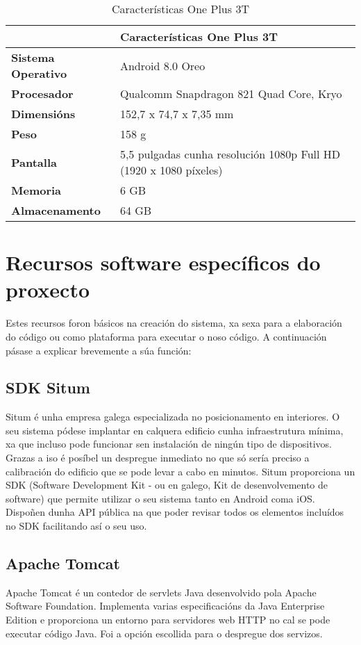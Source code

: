 \begin{table} [tbp]
	\begin{tabular}{|l|p{10cm}|}
		\hline 
		& \textbf{Características One Plus 3T} \\ 
		\hline 
		\textbf{Sistema Operativo} & Android 8.0 Oreo \\ 
		\hline 
		\textbf{Procesador} & Qualcomm Snapdragon 821 Quad Core, Kryo \\ 
		\hline 
		\textbf{Dimensións} & 152,7 x 74,7 x 7,35 mm \\ 
		\hline 
		\textbf{Peso} & 158 g \\ 
		\hline 
		\textbf{Pantalla} & 5,5 pulgadas cunha resolución 1080p Full HD (1920 x 1080 píxeles) \\ 
		\hline 
		\textbf{Memoria} & 6 GB \\ 
		\hline
		\textbf{Almacenamento} & 64 GB \\ 
		\hline 
	\end{tabular}
	\caption{Características One Plus 3T}
	\label{tab:tabCaracteristicasOnePlus}
\end{table}


\section{Recursos software específicos do proxecto}
Estes recursos foron básicos na creación do sistema, xa sexa para a elaboración do código ou como plataforma para executar o noso código. A continuación pásase a explicar brevemente a súa función:

\subsection{SDK Situm}
Situm é unha empresa galega especializada no posicionamento en interiores. O seu sistema pódese implantar en calquera edificio cunha infraestrutura mínima, xa que incluso pode funcionar sen instalación de ningún tipo de dispositivos. Grazas a iso é posíbel un despregue inmediato no que só sería preciso a calibración do edificio que se pode levar a cabo en minutos. Situm proporciona un SDK (Software Development Kit - ou en galego, Kit de desenvolvemento de software) que permite utilizar o seu sistema tanto en Android coma iOS. Dispoñen dunha API pública na que poder revisar todos os elementos incluídos no SDK facilitando así o seu uso.


\subsection{Apache Tomcat}
Apache Tomcat é un contedor de servlets Java desenvolvido pola Apache Software Foundation. Implementa varias especificacións da Java Enterprise Edition e proporciona un entorno para servidores web HTTP no cal se pode executar código Java. Foi a opción escollida para o despregue dos servizos.


